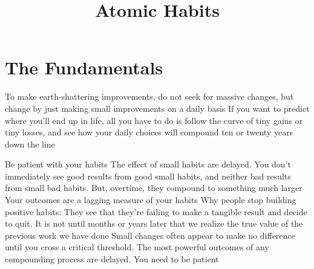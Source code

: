 \documentclass[10pt,twocolumn]{../notes}
\title{Atomic Habits}
\begin{document}
\maketitle
\tableofcontents
\section{The Fundamentals}
\Advice To make earth-shattering improvements, do not seek for massive changes, but change by just making small improvements on a daily basis
\Quote If you want to predict where you’ll end up in life, all you have to do is follow the curve of tiny gains or tiny losses, and see how your daily choices will compound ten or twenty years down the line

\Advice Be patient with your habits
\Fact The effect of small habits are delayed. You don’t immediately see good results from good small habits, and neither bad results from small bad habits. But, overtime, they compound to something much larger
\Quote Your outcomes are a lagging measure of your habits
\Fact Why people stop building positive habits: They see that they’re failing to make a tangible result and decide to quit.
\Quote It is not until months or years later that we realize the true value of the previous work we have done
\Quote Small changes often appear to make no difference until you cross a critical threshold. The most powerful outcomes of any compounding process are delayed. You need to be patient
\end{document}
